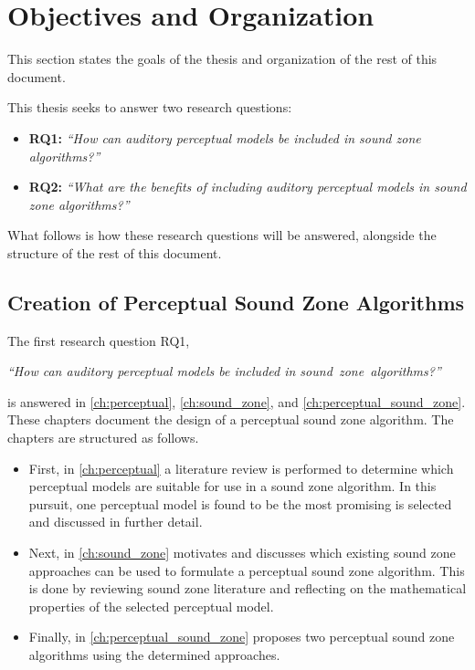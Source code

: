 \section{Objectives and Organization}
\label{ch:introduction:objectives}
This section states the goals of the thesis and organization of the rest of this document.

This thesis seeks to answer two research questions:
\begin{itemize}
    \item \textbf{RQ1:} {\textit{``How can auditory perceptual models be included in sound zone algorithms?''}}
    \item \textbf{RQ2:} {\textit{``What are the benefits of including auditory perceptual models in sound zone algorithms?''}}
\end{itemize}

What follows is how these research questions will be answered, alongside the structure of the rest of this document.

\subsection{Creation of Perceptual Sound Zone Algorithms}
The first research question RQ1, 

\begin{center}
    {\textit{``How can auditory perceptual models be included in sound~zone~algorithms?''}}
\end{center}

is answered in \autoref{ch:perceptual}, \autoref{ch:sound_zone}, and \autoref{ch:perceptual_sound_zone}.
These chapters document the design of a perceptual sound zone algorithm.
The chapters are structured as follows.
\begin{itemize}
    \item First, in \autoref{ch:perceptual} a literature review is performed to determine which perceptual models are suitable for use in a 
        sound zone algorithm.
        In this pursuit, one perceptual model is found to be the most promising is selected and discussed in further detail.
    \item Next, in \autoref{ch:sound_zone} motivates and discusses which existing sound zone approaches can be used to formulate a perceptual sound zone 
        algorithm.
        This is done by reviewing sound zone literature and reflecting on the mathematical properties of the selected perceptual model.
    \item Finally, in \autoref{ch:perceptual_sound_zone} proposes two perceptual sound zone algorithms using the determined approaches.
\end{itemize}

